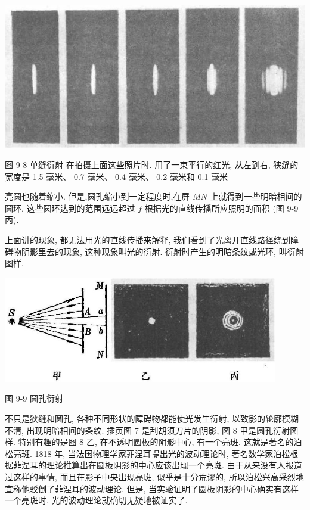 \documentclass[10pt]{article}
\begin{document}
\begin{center}
\includegraphics[max width=1.0\textwidth]{images/01913056-1f15-74d8-9184-9aab52c9d66b_307_298042.jpg}
\end{center}

图 9-8 单缝衍射 在拍摄上面这些照片时. 用了一束平行的红光, 从左到右, 狭缝的宽度是 1.5 毫米、 0.7 毫米、 0.4 毫米、 0.2 毫米和 0.1 毫米

亮圆也随着缩小. 但是,圆孔缩小到一定程度时,在屏 \({MN}\) 上就得到一些明暗相间的圆环, 这些圆环达到的范围远远超过 \(f\) 根据光的直线传播所应照明的面积 (图 9-9 丙).

上面讲的现象, 都无法用光的直线传播来解释, 我们看到了光离开直线路径绕到障碍物阴影里去的现象, 这种现象叫光的衍射. 衍射时产生的明暗条纹或光环, 叫衍射图样.

\begin{center}
\includegraphics[max width=0.9\textwidth]{images/01913056-1f15-74d8-9184-9aab52c9d66b_307_288969.jpg}
\end{center}

图 9-9 圆孔衍射

不只是狭缝和圆孔, 各种不同形状的障碍物都能使光发生衍射, 以致影的轮廓模糊不清, 出现明暗相间的条纹. 插页图 7 是刮胡须刀片的阴影, 图 8 甲是圆孔衍射图样. 特别有趣的是图 8 乙, 在不透明圆板的阴影中心, 有一个亮斑. 这就是著名的泊松亮斑. 1818 年, 当法国物理学家菲涅耳提出光的波动理论时, 著名数学家泊松根据菲涅耳的理论推算出在圆板阴影的中心应该出现一个亮斑. 由于从来没有人报道过这样的事情, 而且在影子中央出现亮斑, 似乎是十分荒谬的, 所以泊松兴高采烈地宣称他驳倒了菲涅耳的波动理论. 但是, 当实验证明了圆板阴影的中心确实有这样一个亮斑时, 光的波动理论就确切无疑地被证实了.
\end{document}
